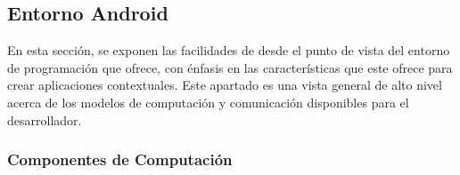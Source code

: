 \subsection{Entorno Android}

En esta sección, se exponen las facilidades de  desde
el punto de vista del entorno de programación que ofrece, con énfasis
en las características que este ofrece para crear aplicaciones contextuales.
Este apartado es una vista general de alto nivel acerca de los modelos
de computación y comunicación disponibles para el desarrollador.

\subsubsection{Componentes de Computación}

